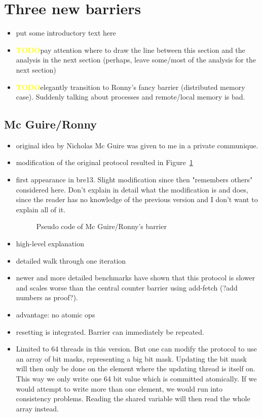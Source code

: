 \documentclass[a4paper, 10pt]{article}
\def \todo{\textbf{\textcolor{yellow}{TODO}}}
\begin{document}
\section{Three new barriers}
\begin{itemize}
	\item put some introductory text here
	\item \todo pay attention where to draw the line between this section and the analysis in the next section (perhaps, leave some/most of the analysis for the next section)
	\item \todo elegantly transition to Ronny's fancy barrier (distributed memory case). Suddenly talking about processes and remote/local memory is bad.
\end{itemize}
\subsection{Mc Guire/Ronny}
\begin{itemize}
	\item original idea by Nicholas Mc Guire was given to me in a private communique.
	\item modification of the original protocol resulted in Figure~\ref{fig:nmg-ronny-with-reset}
	\item first appearance in bre13\cite{bre13}. Slight modification since then "remembers others" considered here. Don't explain in detail what the modification is and does, since the reader has no knowledge of the previous version and I don't want to explain all of it.
		\begin{figure}[htbp]
			\centering
			
			\caption{Pseudo code of Mc Guire/Ronny's barrier}
			\label{fig:nmg-ronny-with-reset}
		\end{figure}
	\item high-level explanation
	\item detailed walk through one iteration
	\item newer and more detailed benchmarks have shown that this protocol is slower and scales worse than the central counter barrier using add-fetch (?add numbers as proof?).
	\item advantage: no atomic ops
	\item resetting is integrated. Barrier can immediately be repeated.
	\item Limited to 64 threads in this version. But one can modify the protocol to use an array of bit masks, representing a big bit mask. Updating the bit mask will then only be done on the element where the updating thread is itself on. This way we only write one 64 bit value which is committed atomically. If we would attempt to write more than one element, we would run into consistency problems. Reading the shared variable will then read the whole array instead.
\end{itemize}
\end{document}
